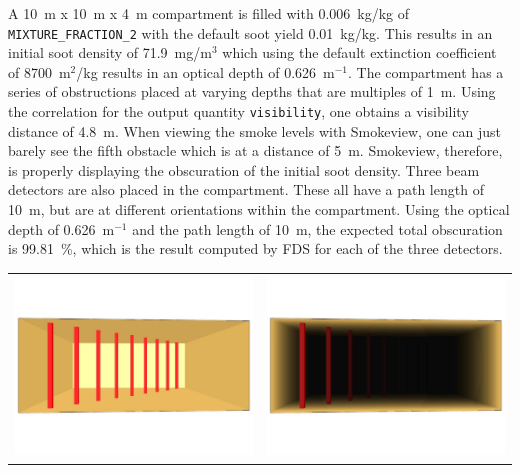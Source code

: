 \documentclass[11pt]{book}
\newcommand{\ct}{\tt\small}
\begin{document}
A 10~m x 10~m x 4~m compartment is filled with 0.006~kg/kg of {\ct MIXTURE\_FRACTION\_2} with the default soot yield
0.01~kg/kg.  This results in an initial soot density of 71.9~mg/m$^3$ which using the default extinction coefficient of
8700~m$^2$/kg results in an optical depth of 0.626~m$^{-1}$.  The compartment has a series of obstructions placed at varying depths that are
multiples of 1~m.  Using the correlation for the output quantity {\ct visibility}, one obtains a visibility distance of 4.8~m.
When viewing the smoke levels with Smokeview, one can just barely see the fifth obstacle which is at a distance of 5~m.
Smokeview, therefore, is properly displaying the obscuration of the initial soot density.  Three beam detectors are also
placed in the compartment.  These all have a path length of 10~m, but are at different orientations within the compartment.
Using the optical depth of 0.626~m$^{-1}$ and the path length of 10~m, the expected total obscuration is 99.81~\%, which is the
result computed by FDS for each of the three detectors.
\begin{tabular*}{\textwidth}{lr}
\includegraphics[width=3.2in]{FIGURES/beam_detector_nosmoke} &
\includegraphics[width=3.2in]{FIGURES/beam_detector_smoke}
\end{tabular*}

\clearpage
\end{document}
